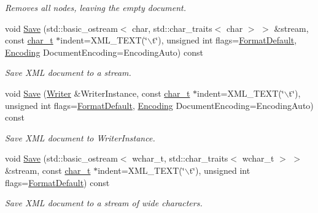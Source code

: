 \begin{DoxyCompactItemize}
\begin{DoxyCompactList}\small\item\em Removes all nodes, leaving the empty document. \item\end{DoxyCompactList}\item 
void \hyperlink{classMezzanine_1_1xml_1_1Document_a9989643114de9d9f5385565bc136122a}{Save} (std::basic\_\-ostream$<$ char, std::char\_\-traits$<$ char $>$ $>$ \&stream, const \hyperlink{namespaceMezzanine_1_1xml_a29b8a47c179e9895c4e9e66c45d1dbbc}{char\_\-t} $\ast$indent=XML\_\-TEXT(\char`\"{}$\backslash$t\char`\"{}), unsigned int flags=\hyperlink{namespaceMezzanine_1_1xml_ad6b5ebd9ea7799aba19391495e2b09e5}{FormatDefault}, \hyperlink{namespaceMezzanine_1_1xml_ab1e7e96991b9c08ac13e797a15253804}{Encoding} DocumentEncoding=EncodingAuto) const 
\begin{DoxyCompactList}\small\item\em Save XML document to a stream. \item\end{DoxyCompactList}\item 
void \hyperlink{classMezzanine_1_1xml_1_1Document_a6aaf5e93d8a80a7a7b99134cb7d993f4}{Save} (\hyperlink{classMezzanine_1_1xml_1_1Writer}{Writer} \&WriterInstance, const \hyperlink{namespaceMezzanine_1_1xml_a29b8a47c179e9895c4e9e66c45d1dbbc}{char\_\-t} $\ast$indent=XML\_\-TEXT(\char`\"{}$\backslash$t\char`\"{}), unsigned int flags=\hyperlink{namespaceMezzanine_1_1xml_ad6b5ebd9ea7799aba19391495e2b09e5}{FormatDefault}, \hyperlink{namespaceMezzanine_1_1xml_ab1e7e96991b9c08ac13e797a15253804}{Encoding} DocumentEncoding=EncodingAuto) const 
\begin{DoxyCompactList}\small\item\em Save XML document to WriterInstance. \item\end{DoxyCompactList}\item 
void \hyperlink{classMezzanine_1_1xml_1_1Document_a01fbf72c8d81497fac24ff035cfb65a8}{Save} (std::basic\_\-ostream$<$ wchar\_\-t, std::char\_\-traits$<$ wchar\_\-t $>$ $>$ \&stream, const \hyperlink{namespaceMezzanine_1_1xml_a29b8a47c179e9895c4e9e66c45d1dbbc}{char\_\-t} $\ast$indent=XML\_\-TEXT(\char`\"{}$\backslash$t\char`\"{}), unsigned int flags=\hyperlink{namespaceMezzanine_1_1xml_ad6b5ebd9ea7799aba19391495e2b09e5}{FormatDefault}) const 
\begin{DoxyCompactList}\small\item\em Save XML document to a stream of wide characters. \item\end{DoxyCompactList}\item 

\end{DoxyCompactItemize}
